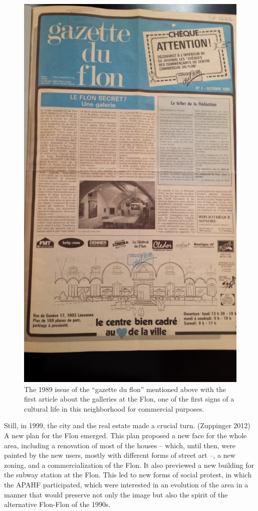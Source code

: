 \documentclass[a4paper,
fontsize=11pt,
oneside,
numbers=noperiodatend,
parskip=half-,
bibliography=totoc,
final
]{scrartcl}
\begin{document}
\begin{figure}[htbp]
\centering
\includegraphics{img/BlumerSchuldt01.jpg}
\caption{The 1989 issue of the \enquote{gazette du flon} mentioned above
with the first article about the galleries at the Flon, one of the first
signs of a cultural life in this neighborhood for commercial purposes.}
\end{figure}

Still, in 1999, the city and the real estate made a crucial turn.
(Zuppinger 2012) A new plan for the Flon emerged. This plan proposed a
new face for the whole area, including a renovation of most of the
houses -- which, until then, were painted by the new users, mostly with
different forms of street art --, a new zoning, and a commercialization
of the Flon. It also previewed a new building for the subway station at
the Flon. This led to new forms of social protest, in which the APAHF
participated, which were interested in an evolution of the area in a
manner that would preserve not only the image but also the spirit of the
alternative Flon-Flon of the 1990s.
\end{document}
